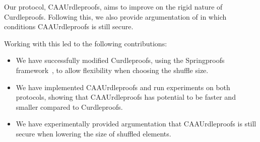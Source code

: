 Our protocol, CAAUrdleproofs, aims to improve on the rigid nature of Curdleproofs.
Following this, we also provide argumentation of in which conditions CAAUrdleproofs is still secure.

Working with this led to the following contributions:
\begin{itemize}
    \item We have successfully modified Curdleproofs, using the Springproofs framework~\cite{zhang2024springproofs}, to allow flexibility when choosing the shuffle size.
    \item We have implemented CAAUrdleproofs and run experiments on both protocols, showing that CAAUrdleproofs has potential to be faster and smaller compared to Curdleproofs.
    \item We have experimentally provided argumentation that CAAUrdleproofs is still secure when lowering the size of shuffled elements.
\end{itemize}


